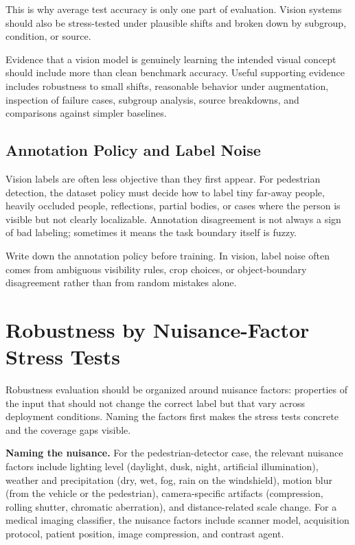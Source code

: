 This is why average test accuracy is only one part of evaluation. Vision systems should also be stress-tested under plausible shifts and broken down by subgroup, condition, or source.

\begin{evidencebox}
Evidence that a vision model is genuinely learning the intended visual concept should include more than clean benchmark accuracy. Useful supporting evidence includes robustness to small shifts, reasonable behavior under augmentation, inspection of failure cases, subgroup analysis, source breakdowns, and comparisons against simpler baselines.
\end{evidencebox}

\subsection{Annotation Policy and Label Noise}

Vision labels are often less objective than they first appear. For pedestrian detection, the dataset policy must decide how to label tiny far-away people, heavily occluded people, reflections, partial bodies, or cases where the person is visible but not clearly localizable. Annotation disagreement is not always a sign of bad labeling; sometimes it means the task boundary itself is fuzzy.

\begin{warningbox}
Write down the annotation policy before training. In vision, label noise often comes from ambiguous visibility rules, crop choices, or object-boundary disagreement rather than from random mistakes alone.
\end{warningbox}

\section{Robustness by Nuisance-Factor Stress Tests}

Robustness evaluation should be organized around nuisance factors: properties of the input that should not change the correct label but that vary across deployment conditions. Naming the factors first makes the stress tests concrete and the coverage gaps visible.

\textbf{Naming the nuisance.} For the pedestrian-detector case, the relevant nuisance factors include lighting level (daylight, dusk, night, artificial illumination), weather and precipitation (dry, wet, fog, rain on the windshield), motion blur (from the vehicle or the pedestrian), camera-specific artifacts (compression, rolling shutter, chromatic aberration), and distance-related scale change. For a medical imaging classifier, the nuisance factors include scanner model, acquisition protocol, patient position, image compression, and contrast agent.

